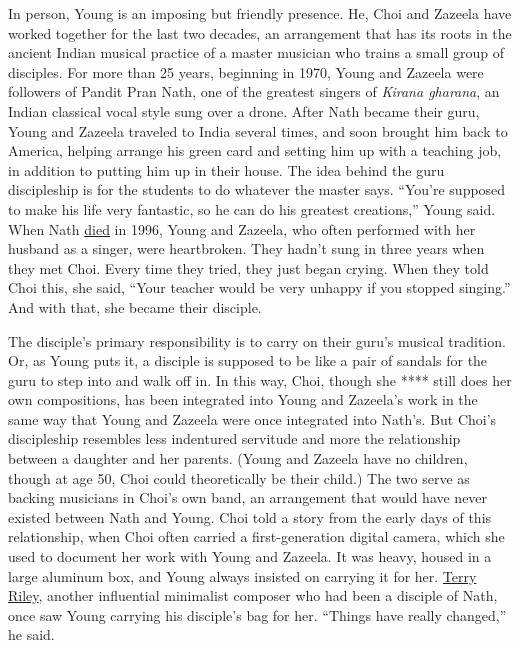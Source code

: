 In person, Young is an imposing but friendly presence. He, Choi and
Zazeela have worked together for the last two decades, an arrangement
that has its roots in the ancient Indian musical practice of a master
musician who trains a small group of disciples. For more than 25 years,
beginning in 1970, Young and Zazeela were followers of Pandit Pran Nath,
one of the greatest singers of \emph{Kirana gharana}, an Indian
classical vocal style sung over a drone. After Nath became their guru,
Young and Zazeela traveled to India several times, and soon brought him
back to America, helping arrange his green card and setting him up with
a teaching job, in addition to putting him up in their house. The idea
behind the guru discipleship is for the students to do whatever the
master says. ``You're supposed to make his life very fantastic, so he
can do his greatest creations,'' Young said. When Nath
\href{https://www.nytimes.com/1996/06/17/arts/pandit-pran-nath-77-singer-in-classical-hindustani-style.html}{died}
in 1996, Young and Zazeela, who often performed with her husband as a
singer, were heartbroken. They hadn't sung in three years when they met
Choi. Every time they tried, they just began crying. When they told Choi
this, she said, ``Your teacher would be very unhappy if you stopped
singing.'' And with that, she became their disciple.

The disciple's primary responsibility is to carry on their guru's
musical tradition. Or, as Young puts it, a disciple is supposed to be
like a pair of sandals for the guru to step into and walk off in. In
this way, Choi, though she **** still does her own compositions, has
been integrated into Young and Zazeela's work in the same way that Young
and Zazeela were once integrated into Nath's. But Choi's discipleship
resembles less indentured servitude and more the relationship between a
daughter and her parents. (Young and Zazeela have no children, though at
age 50, Choi could theoretically be their child.) The two serve as
backing musicians in Choi's own band, an arrangement that would have
never existed between Nath and Young. Choi told a story from the early
days of this relationship, when Choi often carried a first-generation
digital camera, which she used to document her work with Young and
Zazeela. It was heavy, housed in a large aluminum box, and Young always
insisted on carrying it for her.
\href{https://www.nytimes.com/2019/12/19/arts/music/terry-riley.html}{Terry
Riley}, another influential minimalist composer who had been a disciple
of Nath, once saw Young carrying his disciple's bag for her. ``Things
have really changed,'' he said.

